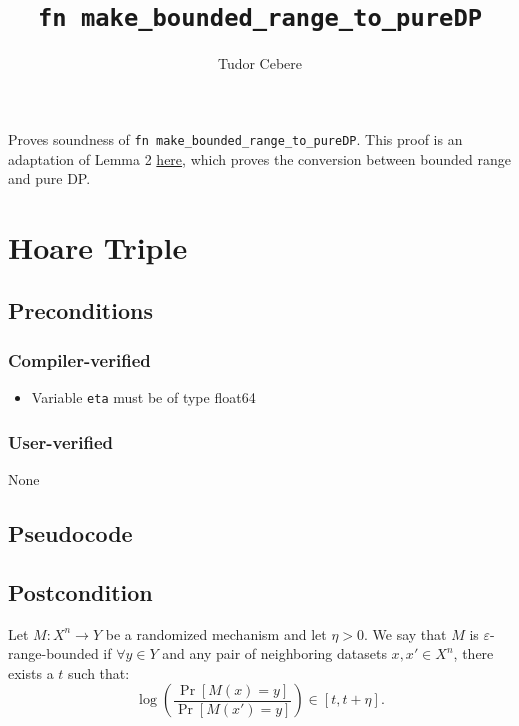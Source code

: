 \documentclass{article}
\title{\texttt{fn make\_bounded\_range\_to\_pureDP}}
\author{Tudor Cebere}
\begin{document}
\maketitle

\contrib
Proves soundness of \texttt{fn make\_bounded\_range\_to\_pureDP}. %
This proof is an adaptation of Lemma 2 \href{https://differentialprivacy.org/exponential-mechanism-bounded-range/}{here}, which proves the conversion between bounded range \cite{durfee2019practical} and pure DP.

\section{Hoare Triple}
\subsection*{Preconditions}
\subsubsection*{Compiler-verified}
\begin{itemize}
    \item Variable \texttt{eta} must be of type float64
\end{itemize}

\subsubsection*{User-verified}
None

\subsection*{Pseudocode}



\subsection*{Postcondition}

\begin{definition}
\label{def:br}
    Let $M : X^n \to Y$ be a randomized mechanism and let $\eta > 0$. 
    We say that $M$ is $\varepsilon$-range-bounded if $\forall y \in Y$ 
    and any pair of neighboring datasets $x, x' \in X^n$, there exists a $t$ such that:
    \begin{equation}
        \log \left( \frac{\Pr[M(x) = y]}{\Pr[M(x') = y]} \right) \in \left[t, t + \eta \right].
    \end{equation}
\end{definition}
\end{document}
